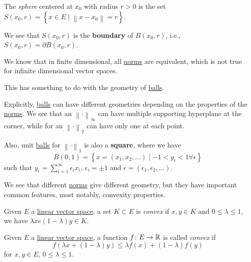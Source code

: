\begin{definition}[Sphere]\label{def:sphere}
	The \emph{sphere} centered at \(x_0\) with radius \(r>0\) is the set \(S(x_0, r) = \left\{ x\in E\mid \left\lVert x - x_0\right\rVert = r\right\} \).
\end{definition}

\begin{remark}
	We see that \(S(x_0, r)\) is the \textbf{boundary} of \(B(x_0, r)\), i.e., \(S(x_0, r) = \partial B(x_0, r)\).
\end{remark}

\begin{note}
	We know that in finite dimensional, all \hyperref[def:norm]{norms} are equivalent, which is not true for infinite dimensional vector spaces.

	This has something to do with the geometry of \hyperref[def:ball]{balls}.
\end{note}

Explicitly, \hyperref[def:ball]{balls} can have different geometries depending on the properties of the \hyperref[def:norm]{norms}. We see that an \(\left\lVert \cdot\right\rVert _{\infty}\) can have multiple supporting hyperplane at the corner, while for an \(\left\lVert \cdot\right\rVert _2\) can have only one at each point.

Also, unit \hyperref[def:ball]{balls} for \(\left\lVert \cdot\right\rVert _1\) is also a \textbf{square}, where we have
\[
	B(0, 1) = \left\{ x = (x_1, x_2, \ldots)\mid -1 < y_{\epsilon } < 1 \forall \epsilon\right\}
\]
such that \(y_{\epsilon } = \sum_{i=1}^{\infty} \epsilon _i x_i \), \(\epsilon _i = \pm 1\) and \(\epsilon = (\epsilon _1, \epsilon _2, \ldots  )\).

We see that different \hyperref[def:norm]{norms} give different geometry, but they have important common features, most notably, convexity properties.

\begin{definition}\label{def:convex-set}
	Given \(E\) a \hyperref[def:linear-vector-space]{linear vector space}, a set \(K\subset E\) is \emph{convex} if \(x, y\in K\) and \(0 \leq \lambda \leq 1\), we have \(\lambda x e (1 - \lambda )y\in K\).
\end{definition}

\begin{definition}\label{def:convex-function}
	Given \(E\) a \hyperref[def:linear-vector-space]{linear vector space}, a function \(f\colon E\to \mathbb{\MakeUppercase{r}} \) is called \emph{convex} if
	\[
		f(\lambda x + (1 - \lambda )y) \leq \lambda f(x) + (1 - \lambda )f(y)
	\]
	for \(x, y\in E\), \(0 \leq \lambda \leq 1\).
\end{definition}

